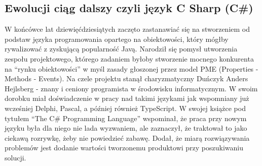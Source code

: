 \documentclass{article}
\begin{document}
	\subsection{Ewolucji ciąg dalszy czyli język C Sharp (C#)}
	W końcówce lat dziewięćdziesiątych zaczęto zastanawiać się na stworzeniem od podstaw języka programowania opartego na obiektowości, który mógłby rywalizować z zyskującą popularność Javą. Narodził się pomysł utworzenia zespołu projektowego, którego zadaniem byłoby stworzenie mocnego konkurenta na “rynku obiektowości” w myśl zasady głoszonej przez model PME (Properties - Methods - Events). Na czele projektu stanął charyzmatyczny Duńczyk Anders Hejlsberg - znany i ceniony programista w środowisku informatycznym. W swoim dorobku miał doświadczenie w pracy nad takimi językami jak wspomniany już wcześniej Delphi, Pascal, a później również TypeScript. W swojej książce pod tytułem “The C\# Programming Language” \cite{ref11} wspominał, że praca przy nowym języku była dla niego nie lada wyzwaniem, ale zaznaczył, że traktował to jako ciekawą rozrywkę, żeby nie powiedzieć zabawę. Dodał, że miarą rozwiązywania problemów jest dodanie wartości tworzonemu produktowi przy poszukiwaniu solucji.
\end{document}
